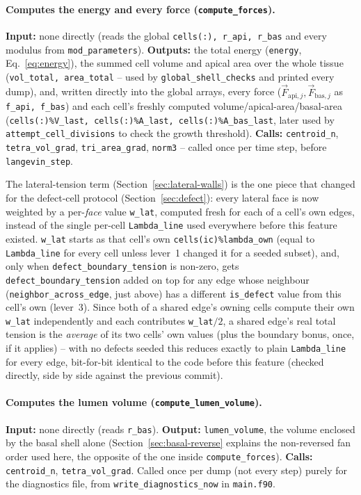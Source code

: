 \documentclass[11pt,a4paper]{report}
\newcommand{\fapi}[1]{\vec F_{\mathrm{api},#1}}
\newcommand{\fbas}[1]{\vec F_{\mathrm{bas},#1}}
\begin{document}
\paragraph{Computes the energy and every force
(\texttt{compute\_forces}).} \textbf{Input:} none directly (reads the
global \texttt{cells(:), r\_api, r\_bas} and every modulus from
\texttt{mod\_parameters}). \textbf{Outputs:} the total energy
(\texttt{energy}, Eq.~\ref{eq:energy}), the summed cell volume and
apical area over the whole tissue (\texttt{vol\_total, area\_total} --
used by \texttt{global\_shell\_checks} and printed every dump), and,
written directly into the global arrays, every force
($\fapi{j},\fbas{j}$ as \texttt{f\_api, f\_bas}) and each cell's
freshly computed volume/apical-area/basal-area (\texttt{cells(:)\%V\_last,
cells(:)\%A\_last, cells(:)\%A\_bas\_last}, later used by
\texttt{attempt\_cell\_divisions} to check the growth threshold).
\textbf{Calls:} \texttt{centroid\_n},
\texttt{tetra\_vol\_grad}, \texttt{tri\_area\_grad}, \texttt{norm3}
-- called once per time step, before \texttt{langevin\_step}.

The lateral-tension term (Section~\ref{sec:lateral-walls}) is the one
piece that changed for the defect-cell protocol
(Section~\ref{sec:defect}): every lateral face is now weighted by a
per-\emph{face} value \texttt{w\_lat}, computed fresh for each of a
cell's own edges, instead of the single per-cell \texttt{Lambda\_line}
used everywhere before this feature existed. \texttt{w\_lat} starts as
that cell's own \texttt{cells(ic)\%lambda\_own} (equal to
\texttt{Lambda\_line} for every cell unless lever~1 changed it for a
seeded subset), and, only when \texttt{defect\_boundary\_tension} is
non-zero, gets \texttt{defect\_boundary\_tension} added on top for any
edge whose neighbour (\texttt{neighbor\_across\_edge}, just above) has
a different \texttt{is\_defect} value from this cell's own (lever~3).
Since both of a shared edge's owning cells compute their own
\texttt{w\_lat} independently and each contributes \texttt{w\_lat}$/2$,
a shared edge's real total tension is the \emph{average} of its two
cells' own values (plus the boundary bonus, once, if it applies) --
with no defects seeded this reduces exactly to plain
\texttt{Lambda\_line} for every edge, bit-for-bit identical to the
code before this feature (checked directly, side by side against the
previous commit).
\paragraph{Computes the lumen volume
(\texttt{compute\_lumen\_volume}).} \textbf{Input:} none directly (reads
\texttt{r\_bas}). \textbf{Output:} \texttt{lumen\_volume}, the volume
enclosed by the basal shell alone (Section~\ref{sec:basal-reverse}
explains the non-reversed fan order used here, the opposite of the one
inside \texttt{compute\_forces}). \textbf{Calls:} \texttt{centroid\_n},
\texttt{tetra\_vol\_grad}. Called once per dump (not every step) purely
for the diagnostics file, from \texttt{write\_diagnostics\_now} in
\texttt{main.f90}.
\end{document}
